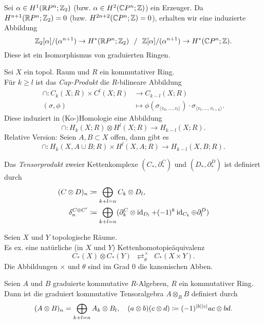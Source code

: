 \documentclass{cheat-sheet}
\newcommand{\angles}[1]{{\langle #1 \rangle}}
\newcommand{\ZM}[1]{\Z_{#1}} %
\begin{document}
\begin{satz}
  Sei $\alpha \in H^1(\R P^n; \ZM{2})$ (bzw. $\alpha \in H^2(\mathbb{C} P^n; \mathbb{Z})$) ein Erzeuger. Da $H^{n+1}(\R P^n; \ZM{2}) = 0$ (bzw. $H^{2n+2}(\mathbb{C} P^n; \mathbb{Z}) = 0$), erhalten wir eine induzierte Abbildung
  \[
    \ZM{2}[\alpha]/(\alpha^{n+1}) \to H^*(\R P^n; \ZM{2})
    \enspace \,/\, \enspace
    \Z[\alpha]/(\alpha^{n+1}) \to H^*(\C P^n; \Z).
  \]
  Diese ist ein Isomorphismus von graduierten Ringen.
\end{satz}

\begin{defn}
  Sei $X$ ein topol. Raum und $R$ ein kommutativer Ring. \\
  Für $k \geq l$ ist das \emph{Cap-Produkt} die $R$-bilineare Abbildung
  \begin{align*}
    \cap : C_k(X; R) \times C^l(X; R) & \to C_{k-l}(X; R) \\
    (\sigma, \phi) & \mapsto \phi(\sigma_\angles{v_0, \ldots, v_l}) \cdot \sigma_\angles{v_l, \ldots, v_{l+k}}.
  \end{align*}
  Diese induziert in (Ko-)Homologie eine Abbildung
  \[ \cap : H_k(X; R) \otimes H^l(X; R) \to H_{k-l}(X; R). \]
  Relative Version: Seien $A, B \subset X$ offen, dann gibt es
  \[ \cap : H_k(X, A \cup B; R) \times H^l(X, A; R) \to H_{k-l}(X, B; R). \]
\end{defn}

\begin{defn}
  Das \emph{Tensorprodukt} zweier Kettenkomplexe $(C_*, \partial^C_*)$ und $(D_*, \partial^D_*)$ ist definiert durch
  \begin{align*}
    (C \otimes D)_n & \coloneqq \bigoplus_{k+l=n} C_k \otimes D_l, \\
    \delta^{C \otimes C'}_n & \coloneqq \bigoplus_{k+l=n} (\partial^C_k \otimes \operatorname{id}_{D_l} + (-1)^k \operatorname{id}_{C_k} \oplus \partial^D_l)
  \end{align*}
\end{defn}

\begin{satz}
  Seien $X$ und $Y$ topologische Räume. \\
  Es ex. eine natürliche (in $X$ und $Y$) Kettenhomotopieäquivalenz
  \[ C_*(X) \otimes C_*(Y) \enspace \mathop{\rightleftarrows}^\times_\theta \enspace C_*(X \times Y). \]
  Die Abbildungen $\times$ und $\theta$ sind im Grad $0$ die kanonischen Abben.
\end{satz}

\begin{defn}
  Seien $A$ und $B$ graduierte kommutative $R$-Algebren, $R$ ein kommutativer Ring. Dann ist die graduiert kommutative Tensoralgebra $A \otimes_R B$ definiert durch
  \[
    (A \otimes B)_n = \bigoplus_{k+l=n} A_k \otimes B_l, \quad
    (a \otimes b)(c \otimes d) \coloneqq (-1)^{\lvert b\rvert \lvert c\rvert} ac \otimes bd.
  \]
\end{defn}
\end{document}
